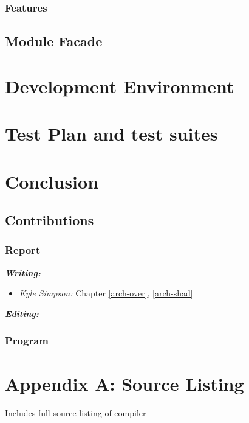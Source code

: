 \documentclass{l3proj}
\begin{document}
\subsection{Features}
\label{arch-shad-features}

\section{Module Facade}
\label{arch-module}

\chapter{Development Environment}
\label{dev}

\chapter{Test Plan and test suites}
\label{test}

\chapter{Conclusion}
\label{conc}

\section{Contributions}
\label{cont}

\subsection{Report}
\label{cont-report}

\textit{\textbf{Writing:}}
\begin{itemize}
\item \emph{Kyle Simpson:} Chapter \ref{arch-over}, \ref{arch-shad}
\end{itemize}
\textit{\textbf{Editing:}}
\subsection{Program}
\label{cont-prog}

\appendix
\chapter{Appendix A: Source Listing}
\label{appa}

Includes full source listing of compiler



\end{document}
